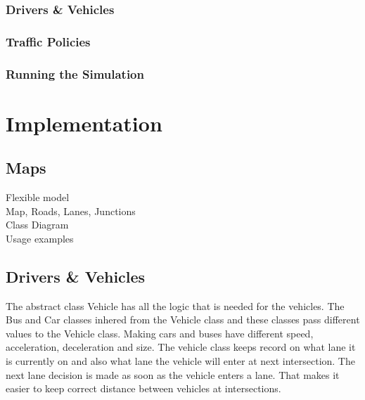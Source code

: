 \documentclass[11pt]{article}
\begin{document}
\subsubsection{Drivers \& Vehicles}
\subsubsection{Traffic Policies}
\subsubsection{Running the Simulation}
	
	
\newpage
\section{Implementation}

\subsection{Maps}

Flexible model
\\
Map, Roads, Lanes, Junctions
\\
Class Diagram
\\
Usage examples

\subsection{Drivers \& Vehicles}
The abstract class Vehicle has all the logic that is needed for the vehicles. The Bus and Car classes inhered from the Vehicle class and these classes pass different values to the Vehicle class. Making cars and buses have different speed, acceleration, deceleration and size. The vehicle class keeps record on what lane it is currently on and also what lane the vehicle will enter at next intersection. The next lane decision is made as soon as the vehicle enters a lane. That makes it easier to keep correct distance between vehicles at intersections.
\end{document}
